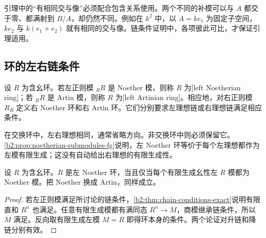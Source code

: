 \ProseParagraphBreak
引理中的“有相同交与像”必须配合包含关系使用。两个不同的补模可以与 \(A\) 都交于零、都满射到 \(B/A\)，却仍然不同。例如在 \(k^2\) 中，以 \(A=ke_1\) 为固定子空间，\(ke_2\) 与 \(k(e_1+e_2)\) 就有相同的交与像。链条件证明中，各项彼此可比，才保证引理适用。

\subsection{环的左右链条件}
\label{b2:subsec:1201:03}

\begin{definition}\label{b2:def:left-right-chain-ring}
	设 \(R\) 为含幺环。若左正则模 \({}_RR\) 是 Noether 模，则称 \(R\) 为[left Noetherian ring]；若 \({}_RR\) 是 Artin 模，则称 \(R\) 为[left Artinian ring]。相应地，对右正则模 \(R_R\) 定义右 Noether 环和右 Artin 环。它们分别要求左理想链或右理想链满足相应条件。
\end{definition}

在交换环中，左右理想相同，通常省略方向。非交换环中则必须保留它。\cref{b2:prop:noetherian-submodules-fg}说明，左 Noether 环等价于每个左理想都作为左模有限生成；这没有自动给出右理想的有限生成性。

\begin{proposition}\label{b2:prop:ring-chain-finitely-generated}
	设 \(R\) 为含幺环。\(R\) 是左 Noether 环，当且仅当每个有限生成幺性左 \(R\) 模都为 Noether 模。把 Noether 换成 Artin，同样成立。
\end{proposition}
\begin{proof}
	若左正则模满足所讨论的链条件，\cref{b2:thm:chain-conditions-exact}说明有限直和 \(R^n\) 也满足。任意有限生成模都有满同态 \(R^n\rightarrow M\)，商模继承链条件，所以 \(M\) 满足。反向取有限生成左模 \(M=R\) 即得环本身的条件。两个论证对升链和降链分别有效。
\end{proof}

